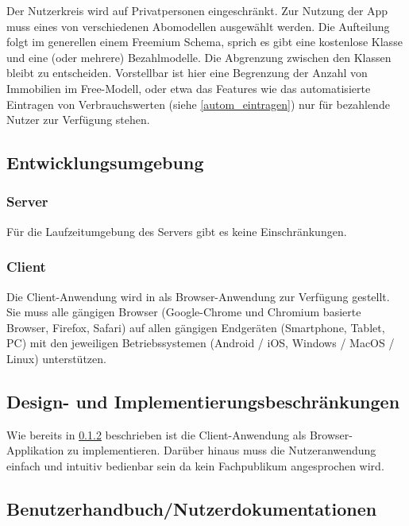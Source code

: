     Der Nutzerkreis wird auf Privatpersonen eingeschränkt. 
    Zur Nutzung der App muss eines von verschiedenen Abomodellen ausgewählt werden.
    Die Aufteilung folgt im generellen einem \glqq{}Freemium\grqq{} Schema, sprich es gibt eine kostenlose Klasse und eine (oder mehrere) Bezahlmodelle. Die Abgrenzung zwischen den Klassen bleibt zu entscheiden. Vorstellbar ist hier eine Begrenzung der Anzahl von Immobilien im Free-Modell, oder etwa das Features wie das automatisierte Eintragen von Verbrauchswerten (siehe \ref{autom_eintragen}) nur für bezahlende Nutzer zur Verfügung stehen.

\subsection{Entwicklungsumgebung}

\subsubsection{Server}

Für die Laufzeitumgebung des Servers gibt es keine Einschränkungen.

\subsubsection{Client}
\label{subsec:OEclient}
    Die Client-Anwendung wird in als Browser-Anwendung zur Verfügung gestellt. Sie muss alle gängigen Browser (Google-Chrome und Chromium basierte Browser, Firefox, Safari) auf allen gängigen Endgeräten (Smartphone, Tablet, PC) mit den jeweiligen Betriebssystemen (Android / iOS, Windows / MacOS / Linux) unterstützen.

\subsection{Design- und Implementierungsbeschränkungen}

Wie bereits in \ref{subsec:OEclient} beschrieben ist die Client-Anwendung als Browser-Applikation zu implementieren. Darüber hinaus muss die Nutzeranwendung einfach und intuitiv bedienbar sein da kein Fachpublikum angesprochen wird.

\subsection{Benutzerhandbuch/Nutzerdokumentationen}


